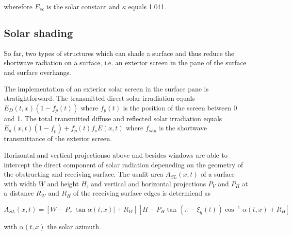 wherefore $E_{sc}$ is the solar constant and $\kappa$ equals 1.041.

\subsection{Solar shading}

So far, two types of structures which can shade a surface and thus reduce the shortwave radiation on a surface, i.e. an exterior screen in the pane of the surface and surface overhangs.

 The implementation of an exterior solar screen in the surface pane is stratightforward. The transmitted direct solar irradiation equals $E_{D}(t,x) \left(1 - f_{p}(t)\right)$ where $f_{p}(t)$ is the position of the screen between 0 and 1. The total transmitted diffuse and reflected solar irradiation equals $E_{d}(x,t) \left(1 - f_{p}\right) +f_{p}(t)  f_{s} E(x,t)$ where $f_{sha}$ is the shortwave transmittance of the exterior screen.

 Horizontal and vertical projectionso above and besides windows are able to intercept the direct component of solar radiation depeneding on the geometry of the obstructing and receiving surface. The usnlit area $A_{SL}(x,t)$ of a surface with width $W$ and height $H$, and vertical and horizontal projections $P_{V}$ and $P_{H}$ at a distance $R_{W}$ and $R_{H}$ of the receiving surface edges is determiend as

\begin{dmath}
A_{SL}(x,t) = \left[W - P_{v}  \left|\tan \alpha(t,x) \right| + R_{W}\right] \left[H - P_{H} \tan \left(\pi - \xi_{h}(t)\right) \cos^{-1} \alpha(t,x) + R_{H}\right]
\end{dmath}

with $\alpha(t,x)$ the solar azimuth.











